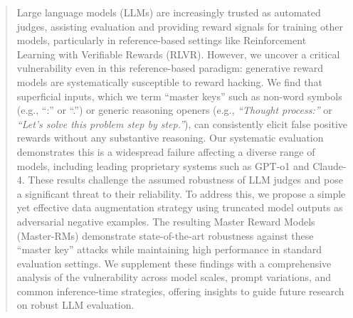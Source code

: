 

\begin{abstract} 

Large language models (LLMs) are increasingly trusted as automated judges, assisting evaluation and providing reward signals for training other models, particularly in reference-based settings like Reinforcement Learning with Verifiable Rewards (RLVR). However, we uncover a critical vulnerability even in this reference-based paradigm: generative reward models are systematically susceptible to reward hacking. We find that superficial inputs, which we term ``master keys'' such as non-word symbols (e.g., ``:'' or ``.'') or generic reasoning openers (e.g., \emph{``Thought process:''} or \emph{``Let's solve this problem step by step.''}), can consistently elicit false positive rewards without any substantive reasoning. Our systematic evaluation demonstrates this is a widespread failure affecting a diverse range of models, including leading proprietary systems such as GPT-o1 and Claude-4. These results challenge the assumed robustness of LLM judges and pose a significant threat to their reliability. To address this, we propose a simple yet effective data augmentation strategy using truncated model outputs as adversarial negative examples. The resulting Master Reward Models (Master-RMs) demonstrate state-of-the-art robustness against these ``master key'' attacks while maintaining high performance in standard evaluation settings. We supplement these findings with a comprehensive analysis of the vulnerability across model scales, prompt variations, and common inference-time strategies, offering insights to guide future research on robust LLM evaluation.




\end{abstract}




